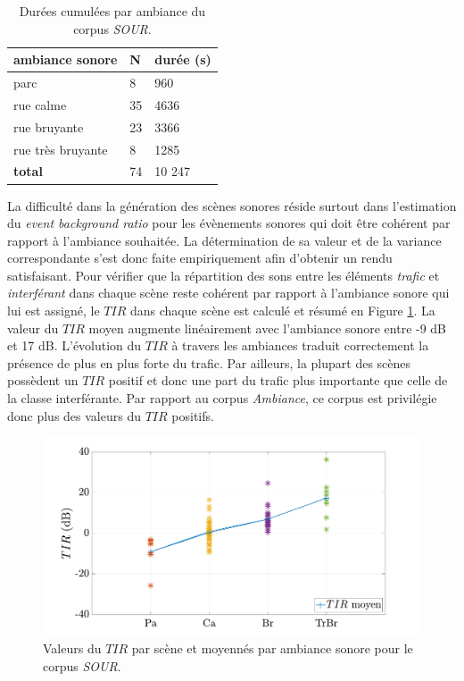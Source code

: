 \begin{table}[h!]
\caption{Durées cumulées par ambiance du corpus \textit{SOUR}.}
\label{tab:resume_sour}
\centering
\begin{tabular}{L{3cm}C{2cm}C{2cm}}
\toprule
\textbf{ambiance sonore}  & \textbf{N} & \textbf{durée (s)}  \\ \toprule
parc & 8 & 960 \\
rue calme & 35 & 4636 \\
rue bruyante & 23 & 3366 \\
rue très bruyante & 8 & 1285 \\ \midrule
\textbf{total} & 74 & 10 247 \\ \bottomrule
\end{tabular}
\end{table}

La difficulté dans la génération des scènes sonores réside surtout dans l'estimation du \textit{event background ratio} pour les évènements sonores qui doit être cohérent par rapport à l'ambiance souhaitée. La détermination de sa valeur et de la variance correspondante s'est donc faite empiriquement afin d'obtenir un rendu satisfaisant. Pour vérifier que la répartition des sons entre les éléments \textit{trafic} et \textit{interférant} dans chaque scène reste cohérent par rapport à l'ambiance sonore qui lui est assigné, le $TIR$ dans chaque scène est calculé et résumé en Figure \ref{fig:tir_grafic}. La valeur du $TIR$ moyen augmente linéairement avec l'ambiance sonore entre -9 dB et 17 dB. L'évolution du $TIR$ à travers les ambiances traduit correctement la présence de plus en plus forte du trafic. Par ailleurs, la plupart des scènes possèdent un $TIR$ positif et donc une part du trafic plus importante que celle de la classe interférante. Par rapport au corpus \textit{Ambiance}, ce corpus est privilégie donc plus des valeurs du $TIR$ positifs. 

\begin{figure}[h]
\centering
\includegraphics[width=.8\linewidth]{./figures/grafic/TIR_grafic.pdf}
\caption{Valeurs du $TIR$ par scène et moyennés par ambiance sonore pour le corpus \textit{SOUR}.}
\label{fig:tir_grafic}
\end{figure}

